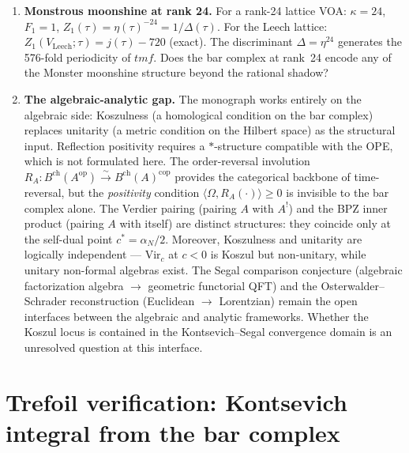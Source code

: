 \documentclass[11pt]{article}
\begin{document}
\begin{enumerate}
  class~$\mathbf{M}$ at $|c| < 6$ diverges geometrically
  with growth rate~$\rho > 1$.  Is this divergent series Borel
  summable?  The expected Stokes structure: in the Euclidean
  frame, the Borel singularities lie on the real axis at
  $\xi = 1/\rho$; the Wick rotation moves them to the imaginary
  axis, clearing the integration contour.
  The modular $S$-transform at the $q \to 1$ boundary
  plays the structural role of Borel resummation.
\item \textbf{Monstrous moonshine at rank 24.}
  For a rank-24 lattice VOA: $\kappa = 24$, $F_1 = 1$,
  $Z_1(\tau) = \eta(\tau)^{-24} = 1/\Delta(\tau)$.  For the
  Leech lattice: $Z_1(V_{\mathrm{Leech}};\tau)
  = j(\tau) - 720$ (exact).  The discriminant $\Delta
  = \eta^{24}$ generates the 576-fold periodicity of $\mathit{tmf}$.
  Does the bar complex at rank~24 encode any of the Monster
  moonshine structure beyond the rational shadow?
\item \textbf{The algebraic-analytic gap.}
  The monograph works entirely on the algebraic side:
  Koszulness (a homological condition on the bar complex)
  replaces unitarity (a metric condition on the Hilbert space)
  as the structural input.  Reflection positivity requires a
  $*$-structure compatible with the OPE, which is not formulated
  here.  The order-reversal involution
  $R_A \colon B^{\mathrm{ch}}(A^{\mathrm{op}})
  \xrightarrow{\sim} B^{\mathrm{ch}}(A)^{\mathrm{cop}}$
  provides the categorical backbone of time-reversal, but the
  \emph{positivity} condition $\langle \Omega, R_A(\cdot)\rangle
  \ge 0$ is invisible to the bar complex alone.  The Verdier
  pairing (pairing $A$ with $A^!$) and the BPZ inner product
  (pairing $A$ with itself) are distinct structures: they
  coincide only at the self-dual point $c^* = \alpha_N/2$.
  Moreover, Koszulness and unitarity are logically independent ---
  $\mathrm{Vir}_c$ at $c < 0$ is Koszul but non-unitary, while
  unitary non-formal algebras exist.  The Segal comparison
  conjecture (algebraic factorization algebra $\to$ geometric
  functorial QFT) and the Osterwalder--Schrader reconstruction
  (Euclidean $\to$ Lorentzian) remain the open interfaces between
  the algebraic and analytic frameworks.  Whether the Koszul locus
  is contained in the Kontsevich--Segal convergence domain is an
  unresolved question at this interface.
\end{enumerate}


\section{Trefoil verification: Kontsevich integral from the bar complex}
\label{sec:trefoil-bar-verification}
\end{document}
